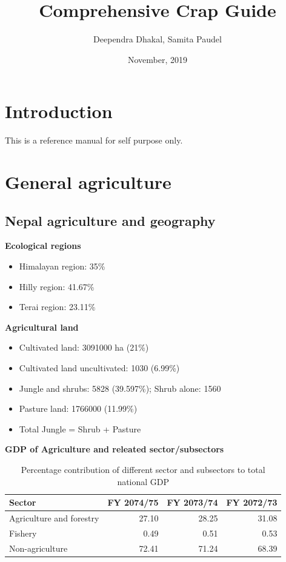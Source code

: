 \documentclass[
  openany]{book}
\title{Comprehensive Crap Guide}
\author{Deependra Dhakal, Samita Paudel}
\date{November, 2019}
\providecommand{\tightlist}{%
  \setlength{\itemsep}{0pt}\setlength{\parskip}{0pt}}
\begin{document}
\maketitle

{
\setcounter{tocdepth}{1}
\tableofcontents
}
\hypertarget{introduction}{%
\chapter{Introduction}\label{introduction}}

This is a reference manual for self purpose only.

\hypertarget{general-agriculture}{%
\chapter{General agriculture}\label{general-agriculture}}

\hypertarget{nepal-agriculture-and-geography}{%
\section{Nepal agriculture and geography}\label{nepal-agriculture-and-geography}}

\textbf{Ecological regions}

\begin{itemize}
\tightlist
\item
  Himalayan region: 35\%
\item
  Hilly region: 41.67\%
\item
  Terai region: 23.11\%
\end{itemize}

\textbf{Agricultural land}

\begin{itemize}
\tightlist
\item
  Cultivated land: 3091000 ha (21\%)
\item
  Cultivated land uncultivated: 1030 (6.99\%)
\item
  Jungle and shrubs: 5828 (39.597\%); Shrub alone: 1560
\item
  Pasture land: 1766000 (11.99\%)
\item
  Total Jungle = Shrub + Pasture
\end{itemize}

\textbf{GDP of Agriculture and releated sector/subsectors}

\begin{table}

\caption{\label{tab:unnamed-chunk-2}Percentage contribution of different sector and subsectors to total national GDP}
\centering
\begin{tabular}[t]{lrrr}
\toprule
Sector & FY 2074/75 & FY 2073/74 & FY 2072/73\\
\midrule
Agriculture and forestry & 27.10 & 28.25 & 31.08\\
Fishery & 0.49 & 0.51 & 0.53\\
Non-agriculture & 72.41 & 71.24 & 68.39\\
\bottomrule
\end{tabular}
\end{table}
\end{document}
